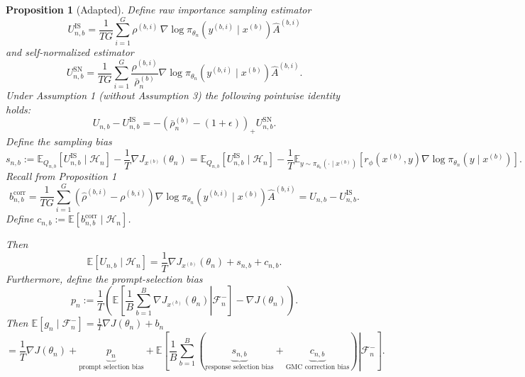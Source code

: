 \documentclass[10pt]{article}
\newcommand{\E}{\mathbb{E}}
\newcommand{\F}{\mathcal{F}}
\newcommand{\Hh}{\mathcal{H}}
\newcommand{\grad}{\nabla}
\newcommand{\xs}{x^{(b)}}
\newcommand{\ys}{y^{(b,i)}}
\newcommand{\Ab}{\widehat A^{(b,i)}}
\newcommand{\rh}{\widehat\rho^{(b,i)}}
\newcommand{\rb}{\rho^{(b,i)}}
\theoremstyle{preserved}
\newtheorem{proposition}{Proposition}
\begin{document}
\setcounter{proposition}{2}
\begin{proposition}[Adapted] Define raw importance sampling estimator
\begin{equation*}
U_{n,b}^{\mathrm{IS}}=\frac1{TG}\sum_{i=1}^G\rb\,\grad\log\pi_{\theta_n}(\ys\mid\xs)\Ab
\end{equation*}
and self-normalized estimator
\begin{equation*}
U_{n,b}^{\mathrm{SN}}=\frac1{TG}\sum_{i=1}^G\frac{\rb}{\bar\rho_n^{(b)}}\grad\log\pi_{\theta_n}(\ys\mid\xs)\Ab.
\end{equation*}
Under Assumption 1 (without Assumption 3) the following pointwise identity holds:
\begin{equation}
 U_{n,b}-U_{n,b}^{\mathrm{IS}}=-\left(\bar\rho_n^{(b)}-(1+\epsilon)\right)_+U_{n,b}^{\mathrm{SN}}.\label{eq:step-1}
\end{equation}
Define the sampling bias
\begin{equation*}
s_{n,b}:=\E_{Q_{n,b}}[U_{n,b}^{\mathrm{IS}}\mid\Hh_n]-\frac1T\grad J_{x^{(b)}}(\theta_n)
=\E_{Q_{n,b}}[U_{n,b}^{\mathrm{IS}}\mid\Hh_n]-\frac1T\E_{y\sim\pi_{\theta_n}(\cdot\mid\xs)}[r_\phi(\xs,y)\nabla \log \pi_{\theta_n}\left(y \mid x^{(b)}\right)].
\end{equation*}
Recall from Proposition 1
\begin{equation*}
b_{n,b}^{\mathrm{corr}}=\frac1{TG}\sum_{i=1}^G(\rh-\rb)\grad\log\pi_{\theta_n}(\ys\mid\xs)\Ab=U_{n,b}-U^{\mathrm{IS}}_{n,b}.
\end{equation*}
Define $c_{n,b}:=\E[b_{n,b}^{\mathrm{corr}}\mid\Hh_n]$.

Then
\begin{equation}
\E[U_{n,b}\mid\Hh_n]=\frac1T\grad J_{x^{(b)}}(\theta_n)+s_{n,b}+c_{n,b}.\label{eq:step-2}
\end{equation}
Furthermore, define the prompt-selection bias
\begin{equation}
p_n:=\frac1T\left(\E\left[\left.\frac1B\sum_{b=1}^B\grad J_{x^{(b)}}(\theta_n)\right|\F_n^-\right]-\grad J(\theta_n)\right).\label{eq:step-3}
\end{equation}
Then $\E[g_n\mid\F_n^-]=\frac1T\grad J(\theta_n)+b_n$
\begin{equation}
=\frac1T\grad J(\theta_n)+\underbrace{p_n}_{\text{prompt selection bias}}+
\E\left[\left.\frac1B\sum_{b=1}^B\left(\underbrace{s_{n,b}}_{\text{response selection bias}}+\underbrace{c_{n,b}}_{\text{GMC correction bias}}\right)\right|\F_n^-\right].\label{eq:step-4}
\end{equation}

\end{proposition}
\end{document}
